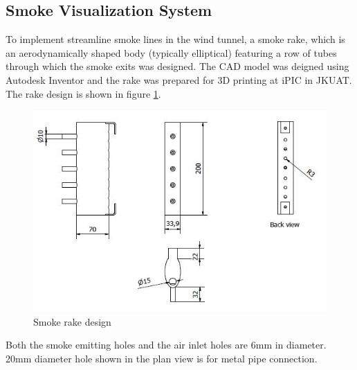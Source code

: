 \subsection{Smoke Visualization System}
To implement streamline smoke lines in the wind tunnel, a smoke rake, which is an aerodynamically shaped
body (typically elliptical) featuring a row of tubes through which the smoke exits was designed. 
The CAD model was deigned using Autodesk Inventor and the rake was prepared for 3D printing at iPIC 
in JKUAT. The rake design is shown in figure \ref{smoke}.
\begin{center}
	\begin{figure}[H]
	\centering
	\includegraphics[width=0.7\linewidth]{Figures/rake design.JPG}
	\caption[Smoke Rake]{Smoke rake design}
	\label{smoke}
	\end{figure}
\end{center}
Both the smoke emitting holes and the air inlet holes are 6mm in diameter. 20mm diameter hole shown in the 
plan view is for metal pipe connection.

